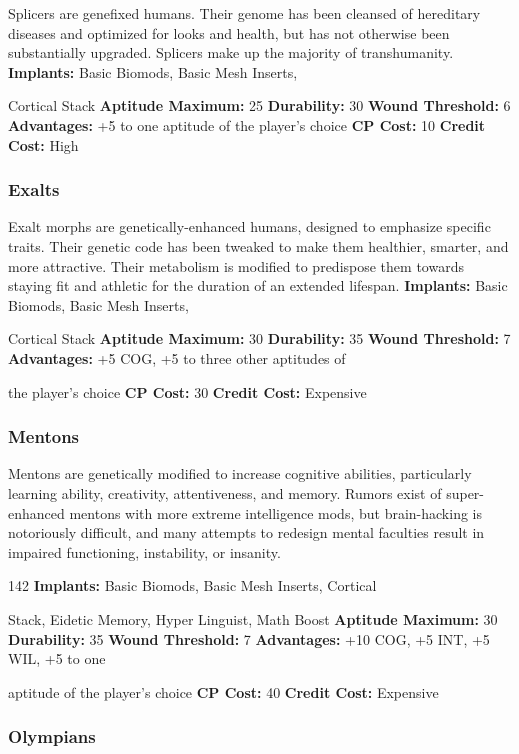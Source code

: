 Splicers are genefixed humans. Their genome has 
been cleansed of hereditary diseases and optimized 
for looks and health, but has not otherwise been 
substantially upgraded. Splicers make up the majority
of transhumanity.
\textbf{Implants: }Basic Biomods, Basic Mesh Inserts, 

Cortical Stack
\textbf{Aptitude Maximum: }25
\textbf{Durability: }30
\textbf{Wound Threshold: }6
\textbf{Advantages: }+5 to one aptitude of the player's choice
\textbf{CP Cost:} 10
\textbf{Credit Cost: }High

\subsubsection{Exalts}

Exalt morphs are genetically-enhanced humans, designed
to emphasize specific traits. Their genetic code
has been tweaked to make them healthier, smarter, 
and more attractive. Their metabolism is modified to 
predispose them towards staying fit and athletic for 
the duration of an extended lifespan.
\textbf{Implants: }Basic Biomods, Basic Mesh Inserts, 

Cortical Stack
\textbf{Aptitude Maximum: }30
\textbf{Durability: }35
\textbf{Wound Threshold: }7
\textbf{Advantages:} +5 COG, +5 to three other aptitudes of 

the player's choice
\textbf{CP Cost: }30
\textbf{Credit Cost: }Expensive

\subsubsection{Mentons}

Mentons are genetically modified to increase cognitive
abilities, particularly learning ability, creativity,
attentiveness, and memory. Rumors exist of super-enhanced
mentons with more extreme intelligence
mods, but brain-hacking is notoriously difficult, and 
many attempts to redesign mental faculties result in 
impaired functioning, instability, or insanity.


142
\textbf{Implants: }Basic Biomods, Basic Mesh Inserts, Cortical 

Stack, Eidetic Memory, Hyper Linguist, Math Boost
\textbf{Aptitude Maximum: }30
\textbf{Durability: }35
\textbf{Wound Threshold: }7
\textbf{Advantages:} +10 COG, +5 INT, +5 WIL, +5 to one 

aptitude of the player's choice
\textbf{CP Cost:} 40
\textbf{Credit Cost: }Expensive

\subsubsection{Olympians}

